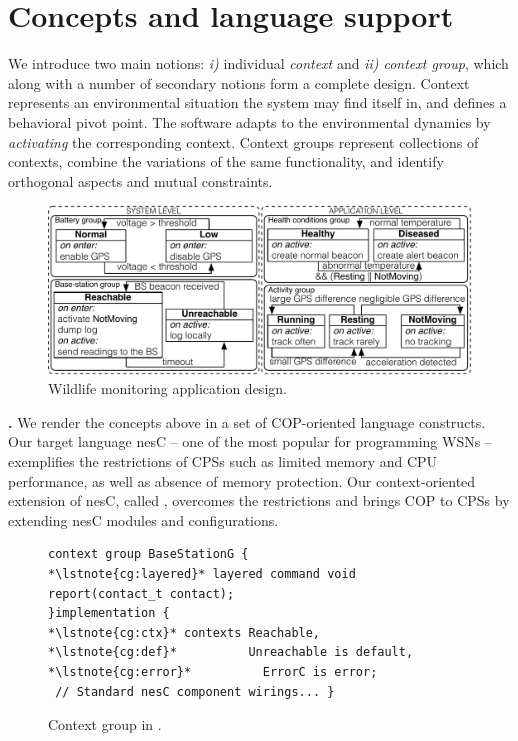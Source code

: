 \section{Concepts and language support}\label{sec:concepts}

We introduce two main notions: \emph{i)} individual \emph{context} and \emph{ii)
context group}, which along with a number of secondary notions form a complete
design. Context represents an environmental situation the system may find itself
in, and defines a behavioral pivot point. The software adapts to the
environmental dynamics by \emph{activating} the corresponding context. Context
groups represent collections of contexts, combine the variations of the same
functionality, and identify orthogonal aspects and mutual constraints.

\begin{figure}
\begin{center}
\includegraphics[scale=.45]{imgs/wildlifetracking}
\vspace{-1mm}
\caption{Wildlife monitoring application design.}
  \label{fig:design}
\vspace{-7mm}
\end{center}
\end{figure}

{\bf \conesc.} We render the concepts above in a set of COP-oriented language
constructs. Our target language nesC -- one of the most popular for programming
WSNs -- exemplifies the restrictions of CPSs such as limited memory and CPU
performance, as well as absence of memory protection. Our context-oriented
extension of nesC, called \conesc, overcomes the restrictions and brings COP to
CPSs by extending nesC modules and configurations.

\begin{figure}[!tb]
\begin{lstlisting}[style=conescframe]
context group BaseStationG {
*\lstnote{cg:layered}* layered command void report(contact_t contact);
}implementation {
*\lstnote{cg:ctx}* contexts Reachable, 
*\lstnote{cg:def}*          Unreachable is default,
*\lstnote{cg:error}*          ErrorC is error;
 // Standard nesC component wirings... }
\end{lstlisting}
\vspace{-3mm}
\caption{Context group in \conesc.}
  \label{fig:configuration}
\vspace{-7mm}
\end{figure}

